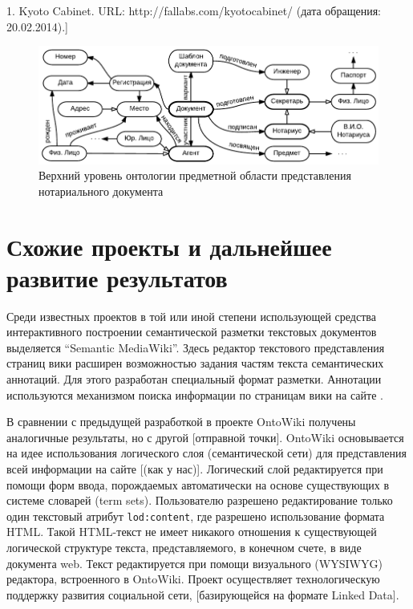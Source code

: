 \documentclass[utf8]{../IncArticle}
\newcommand{\e}[2][fcolor]{\textcolor{pcolor}{[}\textcolor{#1}{#2}\textcolor{pcolor}{]}}
\begin{document}
1.	Kyoto Cabinet. URL: http://fallabs.com/kyotocabinet/ (дата обращения: 20.02.2014).]

\begin{figure}[!t]
\centering
\includegraphics[width=0.8\linewidth]{DocumentOntology-ru.pdf}
\caption{Верхний уровень онтологии предметной области представления
  нотариального документа}
\label{notaryontology}
\end{figure}

\section{Схожие проекты и дальнейшее развитие результатов}

Среди известных проектов в той или иной степени использующей средства
интерактивного построении семантической разметки текстовых документов
выделяется “Semantic MediaWiki”.  Здесь редактор текстового
представления страниц вики расширен возможностью задания частям текста
семантических аннотаций.  Для этого разработан специальный формат
разметки.  Аннотации используются механизмом поиска информации по
страницам вики на сайте \cite{b1:13}.

В сравнении с предыдущей разработкой в проекте OntoWiki \cite{b:2:14}
получены аналогичные результаты, но с другой \e{отправной точки}.
OntoWiki основывается на идее использования логического слоя
(семантической сети) для представления всей информации на сайте
\e{(как у нас)}.  Логический слой редактируется при помощи форм ввода,
порождаемых автоматически на основе существующих в системе словарей
(term sets).  Пользователю разрешено редактирование только один
текстовый атрибут \texttt{lod:content}, где разрешено использование
формата HTML.  Такой HTML-текст не имеет никакого отношения к
существующей логической структуре текста, представляемого, в конечном
счете, в виде документа web.   Текст редактируется при помощи
визуального (WYSIWYG) редактора, встроенного в OntoWiki.  Проект
осуществляет технологическую поддержку развития социальной сети,
\e{базирующейся на формате Linked Data}.
\end{document}
